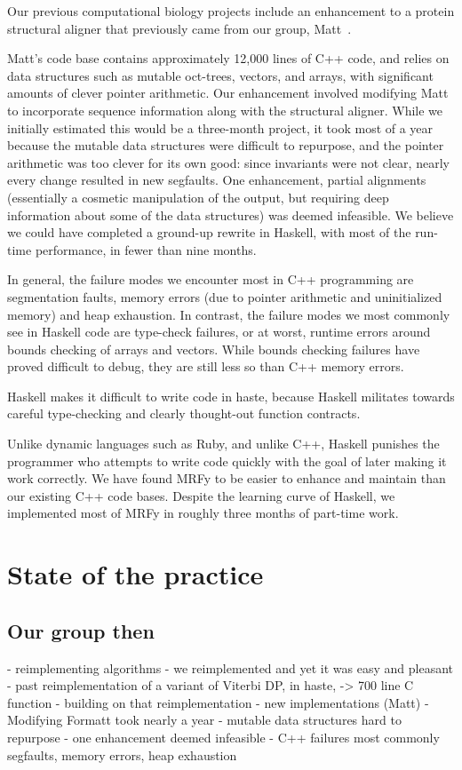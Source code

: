 \documentclass[preprint,nonatbib,blockstyle,nocopyrightspace,times]{sigplanconf}
\let\cite\citep
\begin{document}
Our previous computational biology projects include an enhancement to a protein 
structural aligner that previously came from our group, Matt~\cite{Menke:2008wu}.

Matt's code base contains approximately 12,000 lines of C++ code, and relies on 
data structures such as mutable oct-trees, vectors, and arrays, with 
significant amounts of clever pointer arithmetic.
Our enhancement involved 
modifying Matt to incorporate sequence information along with the structural 
aligner.
While we initially estimated this would be a three-month project, it 
took most of a year because the mutable data structures were difficult to 
repurpose, and the pointer arithmetic was too clever for its own good: since 
invariants were not clear, nearly every change resulted in new segfaults.
One 
enhancement, partial alignments (essentially a cosmetic manipulation of the 
output, but requiring deep information about some of the data structures) was 
deemed infeasible.
We believe we could have completed a ground-up rewrite in 
Haskell, with most of the run-time performance, in fewer than nine months.


In general, the failure modes we encounter most in C++ programming are 
segmentation faults, memory errors (due to pointer arithmetic and uninitialized 
memory) and heap exhaustion.
In contrast, the failure modes we most commonly 
see in Haskell code are type-check failures, or at worst, runtime errors around 
bounds checking of arrays and vectors.
While bounds checking failures have 
proved difficult to debug, they are still less so than C++ memory errors.


Haskell makes it difficult to write code in haste, because Haskell militates 
towards careful type-checking and clearly thought-out function contracts.

Unlike dynamic languages such as Ruby, and unlike C++, Haskell punishes the 
programmer who attempts to write code quickly with the goal of later making it 
work correctly.
We have found MRFy to be easier to enhance and maintain than 
our existing C++ code bases.
Despite the learning curve of Haskell, we 
implemented most of MRFy in roughly three months of part-time work.

 
\section{State of the practice}

\subsection{Our group then}
 - reimplementing algorithms
  - we reimplemented and yet it was easy and pleasant
  - past reimplementation of a variant of Viterbi DP, in haste, -> 700 line C function
  - building on that reimplementation
 - new implementations (Matt)
  - Modifying Formatt took nearly a year
  - mutable data structures hard to repurpose
  - one enhancement deemed infeasible
 - C++ failures most commonly segfaults, memory errors, heap exhaustion
\end{document}
